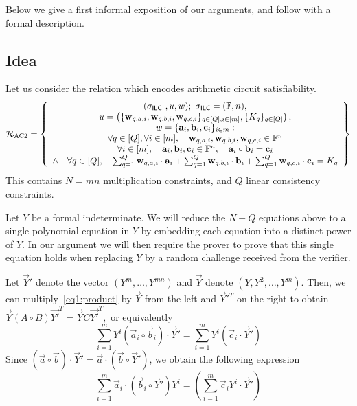 Below we give a first informal exposition of our arguments, and follow with a formal description. 

\subsection{Idea}

Let us consider the relation which encodes arithmetic circuit satisfiability.
\[
\mathcal{R}_{\textnormal{AC2}}=\left\{\begin{array}{c}
(\mathsf{\sigma}_{\mathsf{ILC}~},u,w); \ \mathsf{\sigma}_{\mathsf{ILC}} = (\mathbb{F},n), \\
u = \left( \{\mathbf{w}_{q,{a,i}},\mathbf{w}_{q,{b,i}},\mathbf{w}_{q,{c,i}}\}_{q \in [Q], i \in [m]}, \{K_{q}\}_{q \in [Q]}\right), \\
w = \{\mathbf{a}_i,\mathbf{b}_i,\mathbf{c}_i\}_{i \in m}:\\
\forall q \in [Q], \forall i \in [m], \quad \mathbf{w}_{q,a,i}, \mathbf{w}_{q,b,i}, \mathbf{w}_{q,c,i} \in \mathbb{F}^n \\
\forall i \in [m], \quad \mathbf{a}_i,\mathbf{b}_i,\mathbf{c}_i \in \mathbb{F}^n, \quad \mathbf{a}_i \circ \mathbf{b}_i=\mathbf{c}_i \\
\wedge \quad \forall q \in [Q], \quad \sum_{q=1}^Q \mathbf{w}_{q,a,i} \cdot \mathbf{a}_i + \sum_{q=1}^Q \mathbf{w}_{q,b,i} \cdot \mathbf{b}_i + \sum_{q=1}^Q \mathbf{w}_{q,c,i} \cdot \mathbf{c}_i = K_q
\end{array}\right\}
\]
This contains $N = mn$ multiplication constraints, and $Q$ linear consistency constraints.

Let $Y$ be a formal indeterminate. We will reduce the $N+Q$ equations above to a single polynomial equation in $Y$ by embedding each equation into a distinct power of $Y$. In our argument we will then require the prover to prove that this single equation holds when replacing $Y$ by a random challenge received from the verifier.

Let $\vec{Y}'$ denote the vector $(Y^m,\ldots,Y^{mn})$ and $\vec{Y}$ denote $(Y,Y^2,\ldots,Y^{m})$. Then, we can multiply~\eqref{eq1:product} by $\vec{Y}$ from the left and $\vec{Y}'^T$ on the right to obtain
$ \vec{Y} (A \circ B) \vec{Y'}^T = \vec{Y} C \vec{Y'}^T,$ or equivalently 
$$\sum_{i=1}^m   Y^i (\vec{a}_i \circ \vec{b}_i ) \cdot \vec{Y}'= \sum_{i=1}^m  Y^i (\vec{c}_i \cdot  \vec{Y}')$$
Since $(\vec{a} \circ \vec{b})  \cdot \vec{Y}' = \vec{a} \cdot  (\vec{b} \circ \vec{Y}')$, we obtain the following expression
$$ \sum_{i=1}^m  \vec{a}_i  \cdot ( \vec{b}_i \circ \vec{Y}') Y^i = \left( \sum_{i=1}^m \vec{c}_i Y^i \cdot \vec{Y}' \right)$$

